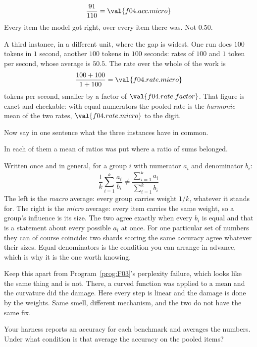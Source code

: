 \begin{fr}
\begin{ansblock}
\[ \frac{91}{110} = \val{f04.acc.micro} \]
Every item the model got right, over every item there was. Not $\num{0.50}$.
\end{ansblock}

A third instance, in a different unit, where the gap is widest. One run does
$100$ tokens in $1$ second, another $100$ tokens in $100$ seconds: rates of
$100$ and $1$ token per second, whose average is $\num{50.5}$. The rate over
the whole of the work is
\[ \frac{100 + 100}{1 + 100} = \val{f04.rate.micro} \]
tokens per second, smaller by a factor of $\val{f04.rate.factor}$. That figure
is exact and checkable: with equal numerators the pooled rate is the
\emph{harmonic} mean of the two rates, $\val{f04.rate.micro}$ to the digit.

Now say in one sentence what the three instances have in common.
\dotline
\nextframe
\end{fr}

\begin{fr}
\begin{ansblock}
In each of them a mean of ratios was put where a ratio of sums belonged.
\end{ansblock}

Written once and in general, for a group $i$ with numerator $a_i$ and
denominator $b_i$:
\[ \frac{1}{k}\sum_{i=1}^{k} \frac{a_i}{b_i} \ne
   \frac{\sum_{i=1}^{k} a_i}{\sum_{i=1}^{k} b_i} \]
The left is the \emph{macro} average: every group carries weight $1/k$,
whatever it stands for. The right is the \emph{micro} average: every item
carries the same weight, so a group's influence is its size. The two agree
exactly when every $b_i$ is equal \dash{} and that is a statement about every
possible $a_i$ at once. For one particular set of numbers they can of course
coincide: two shards scoring the same accuracy agree whatever their sizes.
Equal denominators is the condition you can arrange in advance, which is why it
is the one worth knowing.

Keep this apart from Program~\ref{prog:F03}'s perplexity failure, which looks
like the same thing and is not. There, a curved function was applied to a mean
and the curvature did the damage. Here every step is linear and the damage is
done by the weights. Same smell, different mechanism, and the two do not have
the same fix.

\yourturn
Your harness reports an accuracy for each benchmark and averages the numbers.
Under what condition is that average the accuracy on the pooled items?
\dotline
\nextframe
\end{fr}

